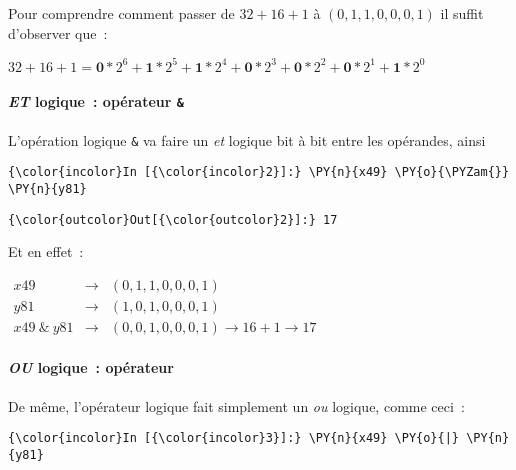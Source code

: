     Pour comprendre comment passer de \(32 + 16 + 1\) à \((0,1,1,0,0,0,1)\)
il suffit d'observer que~:

\(32 + 16 + 1 = \textbf{0}*2^6 + \textbf{1}*2^5 + \textbf{1}*2^4 + \textbf{0}*2^3 + \textbf{0}*2^2 + \textbf{0}*2^1 + \textbf{1}*2^0\)

    \hypertarget{et-logique-opuxe9rateur}{%
\paragraph{\texorpdfstring{\emph{ET} logique~: opérateur
\texttt{\&}}{ET logique~: opérateur \&}}\label{et-logique-opuxe9rateur}}

    L'opération logique \texttt{\&} va faire un \emph{et} logique bit à bit
entre les opérandes, ainsi

    \begin{Verbatim}[commandchars=\\\{\}]
{\color{incolor}In [{\color{incolor}2}]:} \PY{n}{x49} \PY{o}{\PYZam{}} \PY{n}{y81}
\end{Verbatim}


\begin{Verbatim}[commandchars=\\\{\}]
{\color{outcolor}Out[{\color{outcolor}2}]:} 17
\end{Verbatim}
            
    Et en effet~:

\(\begin{array}{rcl} x49 & \rightarrow & (0,1,1,0,0,0,1) \\ y81 & \rightarrow & (1,0,1,0,0,0,1) \\ x49\ \&\ y81 & \rightarrow & (0,0,1,0,0,0,1) \rightarrow 16 + 1 \rightarrow 17 \end{array}\)

    \hypertarget{ou-logique-opuxe9rateur}{%
\paragraph{\texorpdfstring{\emph{OU} logique~: opérateur
\texttt{\textbar{}}}{OU logique~: opérateur \textbar{}}}\label{ou-logique-opuxe9rateur}}

    De même, l'opérateur logique \texttt{\textbar{}} fait simplement un
\emph{ou} logique, comme ceci~:

    \begin{Verbatim}[commandchars=\\\{\}]
{\color{incolor}In [{\color{incolor}3}]:} \PY{n}{x49} \PY{o}{|} \PY{n}{y81}
\end{Verbatim}



